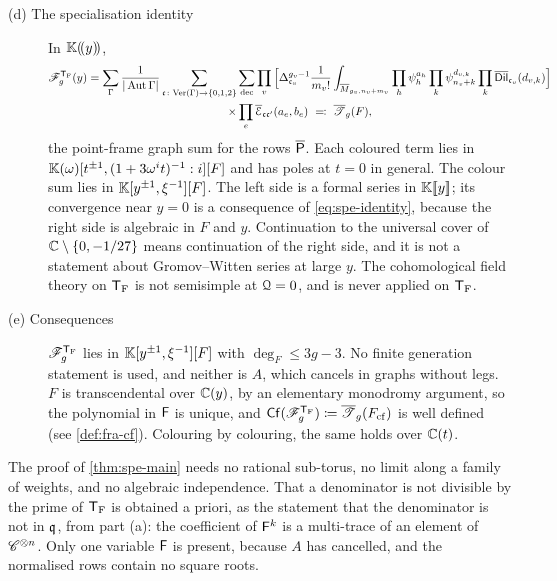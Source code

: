 \begin{thm}[Specialisation]
\begin{description}
\item[(d) The specialisation identity] In $\mathbb{K}(\!(y)\!)$,
\begin{multline}
\label{eq:spe-identity}
\mathscr{F}_g^{\mathsf{T}_{\mathrm{F}}}(y)=\sum_\Gamma\frac{1}{|\operatorname{Aut}\Gamma|}\sum_{\mathfrak{c}\colon\mathrm{Ver}(\Gamma)\to\{0,1,2\}}\sum_{\mathrm{dec}}\prod_v\Big[\Delta_{\mathfrak{c}_v}^{g_v-1}\frac{1}{m_v!}\int_{\overline{M}_{g_v,n_v+m_v}}\prod_h\psi_h^{a_h}\prod_k\psi_{n_v+k}^{d_{v,k}}\prod_k\overline{\mathsf{Dil}}_{\mathfrak{c}_v}(d_{v,k})\Big]\\
\times\prod_e\overline{\mathcal{E}}_{\mathfrak{c}\mathfrak{c}'}(a_e,b_e)\ \eqqcolon\ \overline{\mathscr{T}}_g(F),
\end{multline}
the point-frame graph sum for the rows $\overline{\mathsf{P}}$. Each coloured term lies in $\mathbb{K}(\omega)[t^{\pm1},(1+3\omega^it)^{-1}:i][F]$ and has poles at $t=0$ in general. The colour sum lies in $\mathbb{K}[y^{\pm1},\xi^{-1}][F]$. The left side is a formal series in $\mathbb{K}[\![ y ]\!]$; its convergence near $y=0$ is a consequence of \eqref{eq:spe-identity}, because the right side is algebraic in $F$ and $y$. Continuation to the universal cover of $\mathbb{C}\setminus\{0,-1/27\}$ means continuation of the right side, and it is not a statement about Gromov--Witten series at large $y$. The cohomological field theory on $\mathsf{T}_{\mathrm{F}}$ is not semisimple at $\mathcal{Q}=0$, and \cite{Tel12} is never applied on $\mathsf{T}_{\mathrm{F}}$.

\item[(e) Consequences] $\mathscr{F}_g^{\mathsf{T}_{\mathrm{F}}}$ lies in $\mathbb{K}[y^{\pm1},\xi^{-1}][F]$ with $\deg_F\leq 3g-3$. No finite generation statement is used, and neither is $A$, which cancels in graphs without legs. $F$ is transcendental over $\mathbb{C}(y)$, by an elementary monodromy argument, so the polynomial in $\mathsf{F}$ is unique, and $\mathsf{Cf}(\mathscr{F}_g^{\mathsf{T}_{\mathrm{F}}})\coloneqq\overline{\mathscr{T}}_g(F_{\mathrm{cf}})$ is well defined (see \cref{def:fra-cf}). Colouring by colouring, the same holds over $\mathbb{C}(t)$.
\end{description}
\end{thm}

\begin{rmk}
\label{rmk:spe-noinput}
The proof of \cref{thm:spe-main} needs no rational sub-torus, no limit along a family of weights, and no algebraic independence. That a denominator is not divisible by the prime of $\mathsf{T}_{\mathrm{F}}$ is obtained a priori, as the statement that the denominator is not in $\mathfrak{q}$, from part (a): the coefficient of $\mathsf{F}^k$ is a multi-trace of an element of $\mathscr{C}^{\otimes n}$. Only one variable $\mathsf{F}$ is present, because $A$ has cancelled, and the normalised rows contain no square roots.
\end{rmk}

